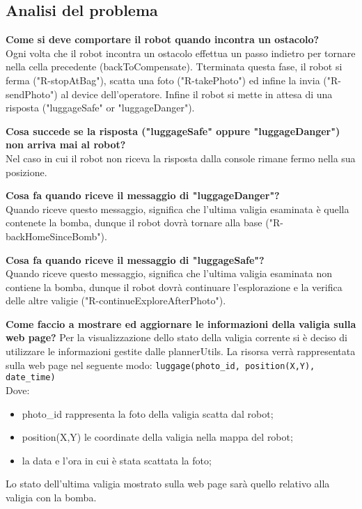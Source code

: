 \subsection{Analisi del problema}
\textbf{Come si deve comportare il robot quando incontra un ostacolo?}\\
Ogni volta che il robot incontra un ostacolo effettua un passo indietro per tornare nella cella precedente (backToCompensate). Tterminata questa fase, il robot si ferma ("R-stopAtBag"), scatta una foto ("R-takePhoto") ed infine la invia ("R-sendPhoto") al device dell'operatore. Infine il robot si mette in attesa di una risposta ("luggageSafe" or "luggageDanger"). 

\textbf{Cosa succede se la risposta ("luggageSafe" oppure "luggageDanger") non arriva mai al robot?}\\
Nel caso in cui il robot non riceva la risposta dalla console rimane fermo nella sua posizione.

\textbf{Cosa fa quando riceve il messaggio di "luggageDanger"?}\\
Quando riceve questo messaggio, significa che l'ultima valigia esaminata è quella contenete la bomba, dunque  il robot dovrà tornare alla base ("R-backHomeSinceBomb"). 

\textbf{Cosa fa quando riceve il messaggio di "luggageSafe"?}\\
Quando riceve questo messaggio, significa che l'ultima valigia esaminata non contiene la bomba, dunque  il robot dovrà continuare l'esplorazione e la verifica delle altre valigie ("R-continueExploreAfterPhoto"). 

\textbf{Come faccio a mostrare ed aggiornare le informazioni della valigia sulla web page?}
Per la visualizzazione dello stato della valigia corrente si è deciso di utilizzare le informazioni gestite dalle plannerUtils. La risorsa verrà rappresentata sulla web page nel seguente modo:
\texttt{luggage(photo\_id, position(X,Y), date\_time)}\\
Dove:
\begin{itemize}
    \item photo\_id rappresenta la foto della valigia scatta dal robot;
    \item position(X,Y) le coordinate della valigia nella mappa del robot;
    \item la data e l'ora in cui è stata scattata la foto;
\end{itemize}

Lo stato dell'ultima valigia mostrato sulla web page sarà quello relativo alla valigia con la bomba.

